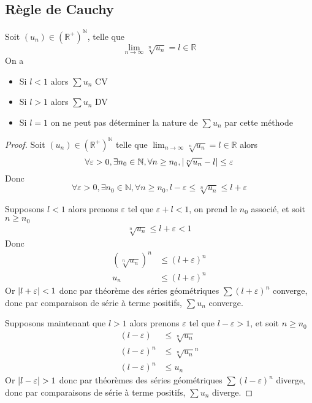 \documentclass[11pt,colorlinks]{book}
\theoremstyle{mytheoremstyle}
\theoremstyle{mytheoremstyle}
\theoremstyle{mytheoremstyle}
\theoremstyle{mytheoremstyle}
\theoremstyle{mytheoremstyle}
\theoremstyle{mytheoremstyle}
\theoremstyle{mytheoremstyle}
\theoremstyle{mytheoremstyle}
\theoremstyle{myproblemstyle}
\def\mbb#1{\mathbb{#1}}
\def\bN{\mbb{N}}
\def\bR{\mbb{R}}
\def\ln{\lim_{n \to \infty}}
\def\rNp{\left(\bR^{+}\right)^{\bN}}
\def\satp{série à terme positifs}
\begin{document}
\subsection{Règle de Cauchy}
\begin{theorem}
  Soit $(u_n) \in \rNp$, telle que 
  \begin{equation*}
    \ln \sqrt[n]{u_n} = l \in \bR
  \end{equation*}
  On a 
  \begin{itemize}
    \item Si $l < 1$ alors $\sum u_n$ CV
    \item Si $l > 1$ alors $\sum u_n$ DV 
    \item Si $l=1$ on ne peut pas déterminer la nature de $\sum u_n$ par cette méthode
  \end{itemize}
  \begin{proof}
    Soit $(u_n) \in \rNp$ telle que $\ln \sqrt[n]{u_n} = l \in \bR$ alors 
    \begin{equation*}
      \forall \varepsilon > 0, \exists n_0 \in \bN, \forall n \geq n_0, \abs{\sqrt[n]{u_n} - l} \leq \varepsilon
    \end{equation*}
    Donc 
    \begin{equation*}
      \forall \varepsilon > 0, \exists n_0 \in \bN, \forall n \geq n_0, l - \varepsilon \leq \sqrt[n]{u_n} \leq l + \varepsilon
    \end{equation*}


    Supposons $l < 1$ alors prenons $\varepsilon$ tel que $\varepsilon+l < 1$, on prend le $n_0$ associé, et soit $n \geq n_0$
    \begin{align*}
      \sqrt[n]{u_n} \leq l + \varepsilon < 1
    \end{align*}
    Donc 
    \begin{align*}
      (\sqrt[n]{u_n})^{n} &\leq \left(l + \varepsilon\right)^n \\
      u_n &\leq \left(l + \varepsilon\right)^n
    \end{align*}
    Or $\abs{l +\varepsilon} < 1$ donc par théorème des séries géométriques $\sum (l+\varepsilon)^n$ converge, donc 
    par comparaison de \satp, $\sum u_n$ converge.\newline

    
    Supposons maintenant que $l > 1$ alors prenons $\varepsilon$ tel que $l - \varepsilon > 1$, et soit $n \geq n_0$
    \begin{align*}
      \left(l - \varepsilon\right) &\leq \sqrt[n]{u_n} \\ 
      \left(l - \varepsilon\right)^n &\leq \sqrt[n]{u_n}^n \\
      \left(l - \varepsilon\right)^n &\leq u_n
    \end{align*}
    Or $\abs{l - \varepsilon} > 1$ donc par théorèmes des séries géométriques $\sum (l-\varepsilon)^n$ diverge, donc 
    par comparaisons de \satp, $\sum u_n$ diverge.
  \end{proof}
\end{theorem}
\end{document}
